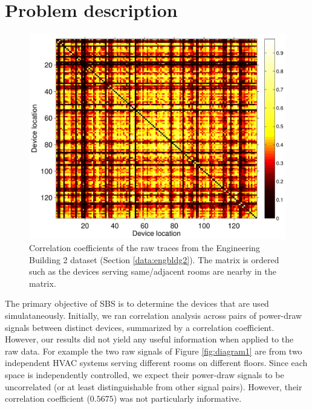 \section{Problem description}
\begin{figure}
\begin{center}
\includegraphics[width=.45\textwidth]{img/heatMap_raw_201106-eps-converted-to.pdf}
\caption{Correlation coefficients of the raw traces from the Engineering Building 2 dataset (Section \ref{data:engbldg2}).
The matrix is ordered such as the devices serving same/adjacent rooms are nearby in the matrix.}
\label{fig:heatmap:raw}
\end{center}
\end{figure}

The primary objective of SBS is to determine the devices that are used simulataneously.
Initially, we ran correlation analysis across pairs of power-draw signals between distinct devices, summarized by
a correlation coefficient.  However, our results did not yield any useful information when applied to 
the raw data.
For example the two raw signals of Figure \ref{fig:diagram1} are from two independent HVAC systems serving different rooms on different floors.
Since each space is independently controlled, we expect their power-draw signals to be uncorrelated (or at least distinguishable 
from other signal pairs).  However, their correlation coefficient ($0.5675$) was not particularly informative.  

